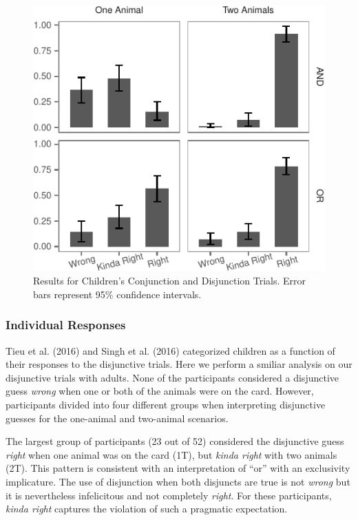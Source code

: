 \documentclass[10pt, letterpaper]{article}
\newenvironment{CodeChunk}{}{}
\begin{document}
\begin{CodeChunk}
\begin{figure}[t]

{\centering \includegraphics{figs/child_data-1} 

}

\caption[Results for Children's Conjunction and Disjunction Trials]{Results for Children's Conjunction and Disjunction Trials. Error bars represent 95\% confidence intervals.}\label{fig:child_data}
\end{figure}
\end{CodeChunk}

\subsubsection{Individual Responses}\label{individual-responses}

Tieu et al. (2016) and Singh et al. (2016) categorized children as a
function of their responses to the disjunctive trials. Here we perform a
smiliar analysis on our disjunctive trials with adults. None of the
participants considered a disjunctive guess \emph{wrong} when one or
both of the animals were on the card. However, participants divided into
four different groups when interpreting disjunctive guesses for the
one-animal and two-animal scenarios.

The largest group of participants (23 out of 52) considered the
disjunctive guess \emph{right} when one animal was on the card (1T), but
\emph{kinda right} with two animals (2T). This pattern is consistent
with an interpretation of ``or'' with an exclusivity implicature. The
use of disjunction when both disjuncts are true is not \emph{wrong} but
it is nevertheless infelicitous and not completely \emph{right}. For
these participants, \emph{kinda right} captures the violation of such a
pragmatic expectation.
\end{document}
